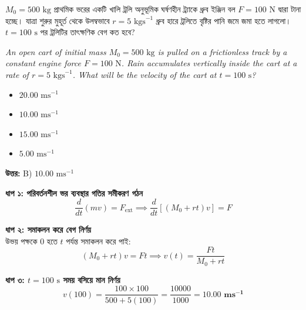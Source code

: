 \documentclass[12pt, a4paper]{article}
\begin{document}
\vspace{2em}

\begin{tcolorbox}[questionbox={প্রশ্ন (Question) 2}]
\noindent
$M_0 = 500\text{ kg}$ প্রাথমিক ভরের একটি খালি ট্রলি অনুভূমিক ঘর্ষণহীন ট্র্যাকে ধ্রুব ইঞ্জিন বল $F = 100\text{ N}$ দ্বারা টানা হচ্ছে। যাত্রা শুরুর মুহূর্ত থেকে উলম্বভাবে $r = 5\text{ kgs}^{-1}$ ধ্রুব হারে ট্রলিতে বৃষ্টির পানি জমে জমা হতে লাগলো। $t = 100\text{ s}$ পর ট্রলিটির তাৎক্ষণিক বেগ কত হবে?
\vspace{0.8em}
\begin{english}
\noindent\textit{\color{darkgray}
An open cart of initial mass $M_0 = 500\text{ kg}$ is pulled on a frictionless track by a constant engine force $F = 100\text{ N}$. Rain accumulates vertically inside the cart at a rate of $r = 5\text{ kgs}^{-1}$. What will be the velocity of the cart at $t = 100\text{ s}$?
}
\end{english}
\end{tcolorbox}

\begin{itemize}[label={}, leftmargin=1cm, itemsep=0.5em]
\item[\textbf{A)}] $20.00\text{ ms}^{-1}$
\item[\textbf{B)}] $10.00\text{ ms}^{-1}$
\item[\textbf{C)}] $15.00\text{ ms}^{-1}$
\item[\textbf{D)}] $5.00\text{ ms}^{-1}$
\end{itemize}
\vspace{0.5em}

\begin{tcolorbox}[answerbox]
\textbf{\color{success} উত্তর:} B) $10.00\text{ ms}^{-1}$
\end{tcolorbox}
\vspace{1em}

\begin{tcolorbox}[solutionbox={সমাধান (Solution)}]
\noindent
\textbf{ধাপ ১: পরিবর্তনশীল ভর ব্যবস্থার গতির সমীকরণ গঠন} \\
\[\frac{d}{dt}(m v) = F_{\text{ext}} \implies \frac{d}{dt} [(M_0 + rt) v] = F\]

\vspace{0.5em}
\noindent\textbf{ধাপ ২: সমাকলন করে বেগ নির্ণয়} \\
উভয় পক্ষকে $0$ হতে $t$ পর্যন্ত সমাকলন করে পাই:
\[(M_0 + rt) v = F t \implies v(t) = \frac{F t}{M_0 + r t}\]

\vspace{0.5em}
\noindent\textbf{ধাপ ৩: $t = 100\text{ s}$ সময় বসিয়ে মান নির্ণয়} \\
\[v(100) = \frac{100 \times 100}{500 + 5(100)} = \frac{10000}{1000} = \mathbf{10.00\text{ ms}^{-1}}\]
\end{tcolorbox}
\end{document}
